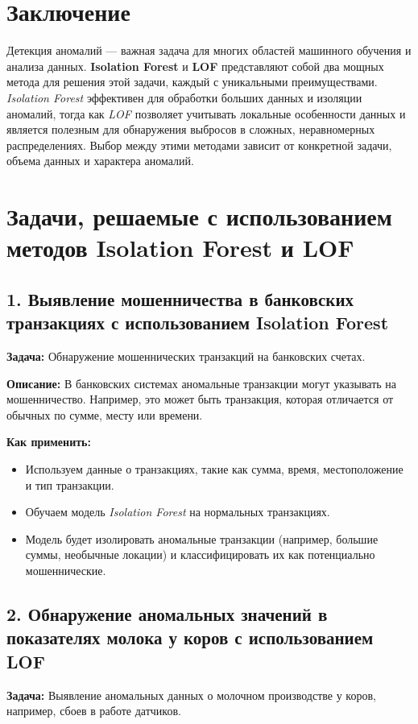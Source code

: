 \section{Заключение}
Детекция аномалий — важная задача для многих областей машинного обучения и анализа данных. \textbf{Isolation Forest} и \textbf{LOF} представляют собой два мощных метода для решения этой задачи, каждый с уникальными преимуществами. \textit{Isolation Forest} эффективен для обработки больших данных и изоляции аномалий, тогда как \textit{LOF} позволяет учитывать локальные особенности данных и является полезным для обнаружения выбросов в сложных, неравномерных распределениях. Выбор между этими методами зависит от конкретной задачи, объема данных и характера аномалий.

\section{Задачи, решаемые с использованием методов Isolation Forest и LOF}

\subsection{1. Выявление мошенничества в банковских транзакциях с использованием Isolation Forest}
\textbf{Задача:} Обнаружение мошеннических транзакций на банковских счетах.

\textbf{Описание:} В банковских системах аномальные транзакции могут указывать на мошенничество. Например, это может быть транзакция, которая отличается от обычных по сумме, месту или времени.

\textbf{Как применить:}
\begin{itemize}
    \item Используем данные о транзакциях, такие как сумма, время, местоположение и тип транзакции.
    \item Обучаем модель \textit{Isolation Forest} на нормальных транзакциях.
    \item Модель будет изолировать аномальные транзакции (например, большие суммы, необычные локации) и классифицировать их как потенциально мошеннические.
\end{itemize}

\subsection{2. Обнаружение аномальных значений в показателях молока у коров с использованием LOF}
\textbf{Задача:} Выявление аномальных данных о молочном производстве у коров, например, сбоев в работе датчиков.

